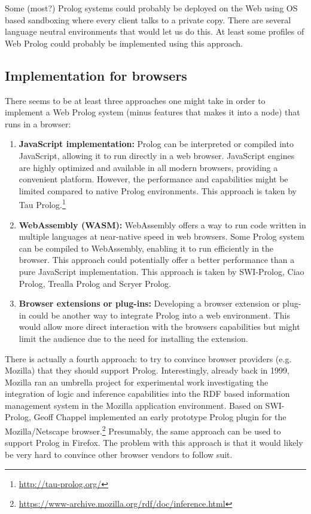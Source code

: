 Some (most?) Prolog systems could probably be deployed on the Web using OS based sandboxing where every client talks to a private copy. There are several language neutral environments that would let us do this. At least some profiles of Web Prolog could probably be implemented using this approach.

\subsection{Implementation for browsers}\label{sec:browser-implementation}

There seems to be at least three approaches one might take in order to implement a Web Prolog system (minus features that makes it into a node) that runs in a browser:

\begin{enumerate}
\item
  \textbf{JavaScript implementation:} Prolog can be interpreted or
  compiled into JavaScript, allowing it to run directly in a web
  browser. JavaScript engines are highly optimized and available in all
  modern browsers, providing a convenient platform. However, the
  performance and capabilities might be limited compared to native
  Prolog environments. This approach is taken by Tau Prolog.\footnote{\url{http://tau-prolog.org/}}
\item
  \textbf{WebAssembly (WASM):} WebAssembly offers a way to run code
  written in multiple languages at near-native speed in web browsers. Some
  Prolog system can be compiled to WebAssembly, enabling it to run
  efficiently in the browser. This approach could potentially offer a
  better performance than a pure JavaScript implementation. This approach is taken by SWI-Prolog, Ciao Prolog, Trealla Prolog and Scryer Prolog.
\item
  \textbf{Browser extensions or plug-ins:} Developing a browser
  extension or plug-in could be another way to integrate Prolog into a
  web environment. This would allow more direct interaction with the
  browser\textquotesingle s capabilities but might limit the audience
  due to the need for installing the extension.
\end{enumerate}

\noindent There is actually a fourth approach: to try to convince browser providers (e.g. Mozilla) that they should support Prolog. Interestingly, already back in 1999, Mozilla ran an umbrella project for experimental work investigating the integration of logic and inference capabilities into the RDF based information management system in the Mozilla application environment. Based on SWI-Prolog, Geoff Chappel implemented an early prototype Prolog plugin for the Mozilla/Netscape browser.\footnote{\url{https://www-archive.mozilla.org/rdf/doc/inference.html}} Presumably, the same approach can be used to support Prolog in Firefox. The problem with this approach is that it would likely be very hard to convince other browser vendors to follow suit.

